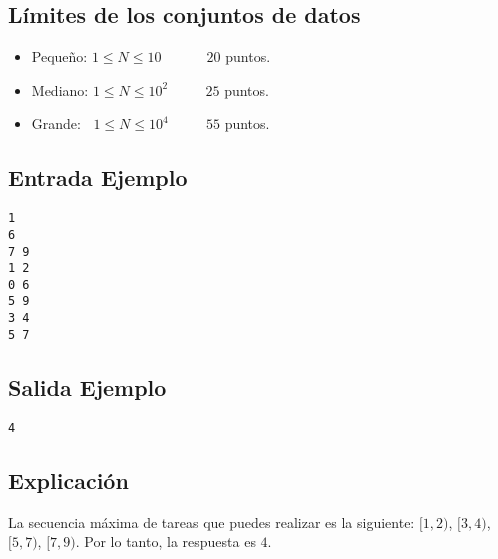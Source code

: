 \subsection*{Límites de los conjuntos de datos}

\begin{itemize}
    \item Pequeño: $ 1 \leq N \leq 10 $ $\quad \quad \;\;$ $20$ puntos.
    \item Mediano: $ 1 \leq N \leq 10^2 $ $\quad \quad$ $25$ puntos.
    \item Grande:  $\;\; 1 \leq N \leq 10^4 $ $\quad \quad$ $55$ puntos.
\end{itemize}

\begin{multicols}{2}
\subsection*{Entrada Ejemplo}
\begin{verbatim}
1
6
7 9
1 2
0 6
5 9
3 4
5 7

\end{verbatim}
\columnbreak
\subsection*{Salida Ejemplo}
\begin{verbatim}
4
\end{verbatim}
\end{multicols}

\subsection*{Explicación}
La secuencia máxima de tareas que puedes realizar es la siguiente:
$[1,2)$, $[3,4)$, $[5,7)$, $[7,9)$. Por lo tanto, la respuesta es $4$. 

